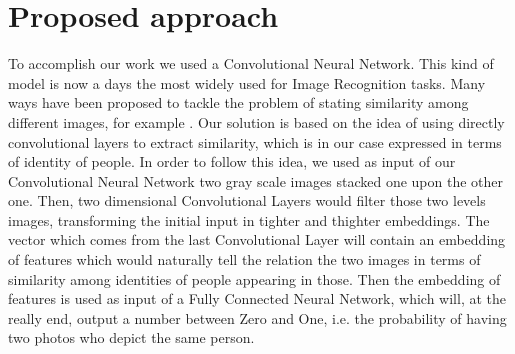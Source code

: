 \section{Proposed approach}
%

To accomplish our work we used a Convolutional Neural Network. This kind of model is now a days the most widely used for Image Recognition tasks. Many ways have been proposed to tackle the problem of stating similarity among different images, for example . Our solution is based on the idea of using directly convolutional layers to extract similarity, which is in our case expressed in terms of identity of people. In order to follow this idea, we used as input of our Convolutional Neural Network two gray scale images stacked one upon the other one. Then, two dimensional Convolutional Layers would filter those two levels images, transforming the initial input in tighter and thighter embeddings. The vector which comes from the last Convolutional Layer will contain an embedding of features which would naturally tell the relation the two images in terms of similarity among identities of people appearing in those. Then the embedding of features is used as input of a Fully Connected Neural Network, which will, at the really end, output a number between Zero and One, i.e. the probability of having two photos who depict the same person.

